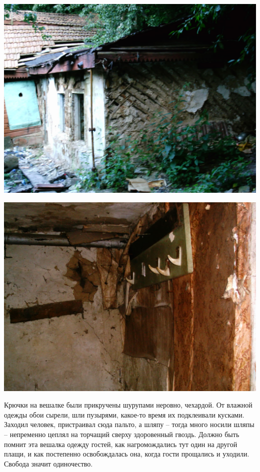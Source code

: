 \begin{center}
\includegraphics[width=\linewidth]{chast-colebanie-osnov/borichev-tok/bort-imag0023.jpg}
\end{center}

\begin{center}
\includegraphics[width=\linewidth]{chast-colebanie-osnov/borichev-tok/bort-imag0033.jpg}
\end{center}

Крючки на вешалке были прикручены шурупами неровно, чехардой. От влажной одежды обои сырели, шли пузырями, какое-то время их подклеивали кусками. Заходил человек, пристраивал сюда пальто, а шляпу – тогда много носили шляпы – непременно цеплял на торчащий сверху здоровенный гвоздь. Должно быть помнит эта вешалка одежду гостей, как нагромождались тут один на другой плащи, и как постепенно освобождалась она, когда гости прощались и уходили. Свобода значит одиночество.
 
